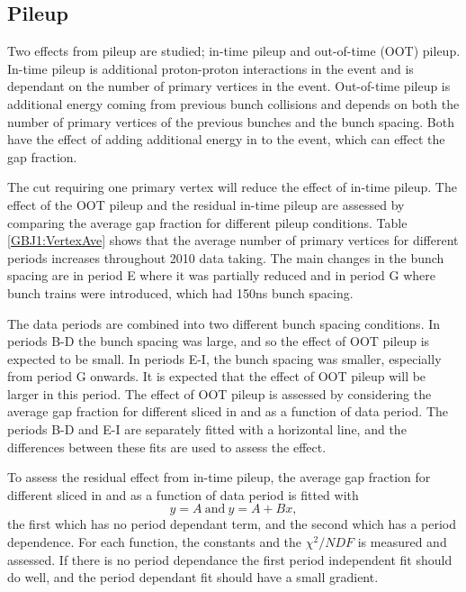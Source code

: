 
\subsection{Pileup}
\label{sec:GBJ1:Pileup}



Two effects from pileup are studied; in-time pileup and out-of-time (OOT) pileup.
In-time pileup is additional proton-proton interactions in the event and is dependant on the number of primary vertices in the event.
Out-of-time pileup is additional energy coming from previous bunch collisions and depends on both the number of primary vertices of the previous bunches and the bunch spacing. 
Both have the effect of adding additional energy in to the event, which can effect the gap fraction.

The cut requiring one primary vertex will reduce the effect of in-time pileup. 
The effect of the OOT pileup and the residual in-time pileup are assessed by comparing the average gap fraction for different pileup conditions.
Table \ref{GBJ1:VertexAve} shows that the average number of primary vertices for different periods increases throughout 2010 data taking. 
The main changes in the bunch spacing are in period E where it was partially reduced and in period G where bunch trains were introduced, which had 150ns bunch spacing. 


The data periods are combined into two different bunch spacing conditions.
In periods B-D the bunch spacing was large, and so the effect of OOT pileup is expected to be small.
In periods E-I, the bunch spacing was smaller, especially from period G onwards.
It is expected that the effect of OOT pileup will be larger in this period.
The effect of OOT pileup is assessed by considering the average gap fraction for different sliced in \dy{} and \ptb{} as a function of data period.
The periods B-D and E-I are separately fitted with a horizontal line, and the differences between these fits are used to assess the effect. 

To assess the residual effect from in-time pileup, the average gap fraction for different sliced in \dy{} and \ptb{} as a function of data period is fitted with
\begin{equation}                              
y = A~\mathrm{and}~y = A + B x,
\label{GBJ1:Fit2}
\end{equation}
the first which has no period dependant term, and the second which has a period dependence.
For each function, the constants and the  $\chi^2/NDF$ is measured and assessed.
If there is no period dependance the first period independent fit should do well, and the period dependant fit should have a small gradient. 


